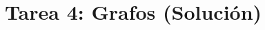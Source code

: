 \documentclass{doc}
\title{Tarea 4: Grafos (Solución)}
\begin{document}
\makedocheader
\soluciontrue

\end{document}
